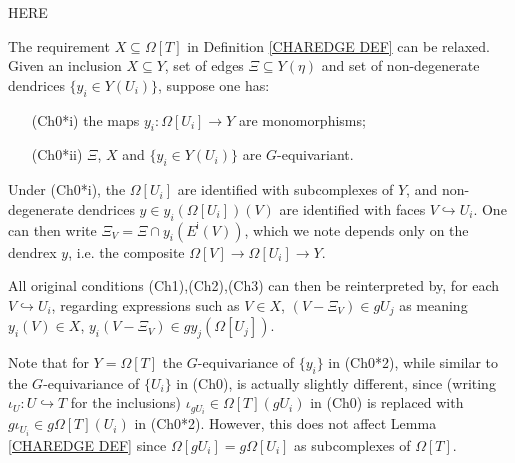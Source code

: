 \documentclass[a4paper,10pt,draft]{article}%
\begin{document}
{\color{red} HERE}




\begin{remark}\label{CHAREDGE2 REM}
The requirement $X \subseteq \Omega[T]$ in Definition \ref{CHAREDGE DEF} can be relaxed.
Given an inclusion $X \subseteq Y$,
set of edges $\Xi \subseteq Y(\eta)$ and 
set of non-degenerate dendrices $\{y_i \in Y(U_i)\}$, suppose one has:
\begin{itemize}
	\item[(Ch0*i)] the maps $y_i \colon \Omega[U_i] \to Y$ are monomorphisms;
	\item[(Ch0*ii)] $\Xi$, $X$ and $\{y_i \in Y(U_i)\}$ are $G$-equivariant.
\end{itemize}
Under (Ch0*i),
the $\Omega[U_i]$ are identified with subcomplexes of $Y$,
and non-degenerate dendrices $y \in y_i(\Omega[U_i])(V)$
are identified with faces $V \hookrightarrow U_i$.
One can then write $\Xi_V = \Xi \cap y_i(E^{\mathsf{i}}(V))$,
which we note depends only on the dendrex $y$, 
i.e. the composite $\Omega[V] \to \Omega[U_i] \to Y$.

All original conditions (Ch1),(Ch2),(Ch3) can then be reinterpreted by, 
for each $V \hookrightarrow U_i$, 
regarding expressions such as $V \in X$, $(V-\Xi_V)\in g U_j$
as meaning $y_i(V) \in X$, $y_i(V-\Xi_V) \in g y_j(\Omega[U_j])$.

Note that for $Y = \Omega[T]$ the $G$-equivariance of $\{y_i\}$ in  (Ch0*2), while similar to the $G$-equivariance of $\{U_i\}$ in (Ch0), is actually slightly different, 
since (writing $\iota_U \colon U \hookrightarrow T$ for the inclusions) $\iota_{g U_i} \in \Omega[T](g U_i)$ in (Ch0)
is replaced with $g \iota_{U_i} \in g\Omega[T](U_i)$ in (Ch0*2).
However, this does not affect Lemma \ref{CHAREDGE DEF} since
$\Omega[gU_i] = g\Omega[U_i]$ as subcomplexes of $\Omega[T]$.


\end{remark}
\end{document}
